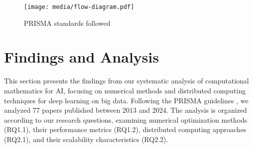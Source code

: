 \documentclass[acmsmall]{acmart}
\begin{document}

\begin{figure}
    \centering
    \texttt{[image: media/flow-diagram.pdf]}
    \caption{PRISMA standards followed}
    \label{fig:PRISMA-standards}
\end{figure}

\section{Findings and Analysis}\label{sec:findings-and-analysis}
This section presents the findings from our systematic analysis of computational mathematics for AI, focusing on numerical methods and distributed computing techniques for deep learning on big data. Following the PRISMA guidelines \citep{moher2009preferred}, we analyzed 77 papers published between 2013 and 2024. The analysis is organized according to our research questions, examining numerical optimization methods (RQ1.1), their performance metrics (RQ1.2), distributed computing approaches (RQ2.1), and their scalability characteristics (RQ2.2).
\end{document}
